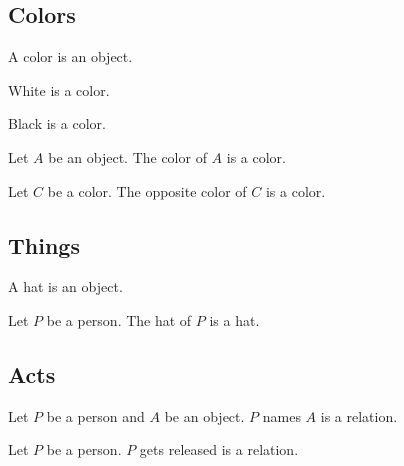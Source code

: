 \documentclass{article}
\begin{document}
\subsection{Colors}

\begin{forthel}
  \begin{signature*}
    A color is an object.
  \end{signature*}

  \begin{signature*}
    White is a color.
  \end{signature*}

  \begin{signature*}
    Black is a color.
  \end{signature*}

  \begin{signature*}
    Let $A$ be an object.
    The color of $A$ is a color.
  \end{signature*}

  \begin{signature*}
    Let $C$ be a color.
    The opposite color of $C$ is a color.
  \end{signature*}
\end{forthel}


\subsection{Things}

\begin{forthel}
  \begin{signature*}
    A hat is an object.
  \end{signature*}

  \begin{signature*}
    Let $P$ be a person.
    The hat of $P$ is a hat.
  \end{signature*}
\end{forthel}


\subsection{Acts}

\begin{forthel}
  \begin{signature*}
    Let $P$ be a person and $A$ be an object.
    $P$ names $A$ is a relation.
  \end{signature*}

  \begin{signature*}
    Let $P$ be a person.
    $P$ gets released is a relation.
  \end{signature*}
\end{forthel}
\end{document}
